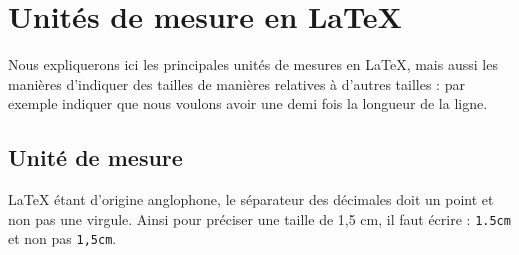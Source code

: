 \chapter{Unités de mesure en \LaTeX{}}

\begin{prealable}
	Nous expliquerons ici les principales unités de mesures en \LaTeX{}, mais aussi les manières d'indiquer des tailles de manières relatives à d'autres tailles : par exemple indiquer que nous voulons avoir une demi fois la longueur de la ligne.
\end{prealable}

\section{Unité de mesure}

\LaTeX{} étant d'origine anglophone, le séparateur des décimales doit un point et non pas une virgule. Ainsi pour préciser une taille de 1,5 cm, il faut écrire : \verb|1.5cm| et non pas \verb|1,5cm|.

